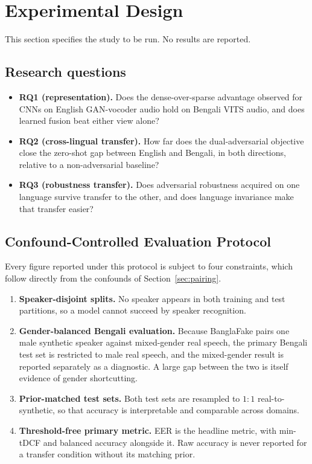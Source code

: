\documentclass[conference]{IEEEtran}
\renewcommand{\cite}[1]{\unskip}
\begin{document}
\section{Experimental Design}
\label{sec:design}

This section specifies the study to be run. No results are reported.

\subsection{Research questions}
\begin{itemize}
\item \textbf{RQ1 (representation).} Does the dense-over-sparse advantage
observed for CNNs on English GAN-vocoder audio hold on Bengali VITS audio,
and does learned fusion beat either view alone?
\item \textbf{RQ2 (cross-lingual transfer).} How far does the
dual-adversarial objective close the zero-shot gap between English and
Bengali, in both directions, relative to a non-adversarial baseline?
\item \textbf{RQ3 (robustness transfer).} Does adversarial robustness
acquired on one language survive transfer to the other, and does language
invariance make that transfer easier?
\end{itemize}

\subsection{Confound-Controlled Evaluation Protocol}
\label{sec:ccep}
Every figure reported under this protocol is subject to four constraints,
which follow directly from the confounds of Section~\ref{sec:pairing}.

\begin{enumerate}
\item \textbf{Speaker-disjoint splits.} No speaker appears in both training
and test partitions, so a model cannot succeed by speaker recognition.
\item \textbf{Gender-balanced Bengali evaluation.} Because BanglaFake pairs
one male synthetic speaker against mixed-gender real speech, the primary
Bengali test set is restricted to male real speech, and the mixed-gender
result is reported separately as a diagnostic. A large gap between the two
is itself evidence of gender shortcutting.
\item \textbf{Prior-matched test sets.} Both test sets are resampled to
$1{:}1$ real-to-synthetic, so that accuracy is interpretable and comparable
across domains.
\item \textbf{Threshold-free primary metric.} EER is the headline metric,
with min-tDCF \cite{kinnunen2018tdcf} and balanced accuracy alongside it.
Raw accuracy is never reported for a transfer condition without its
matching prior.
\end{enumerate}
\end{document}
